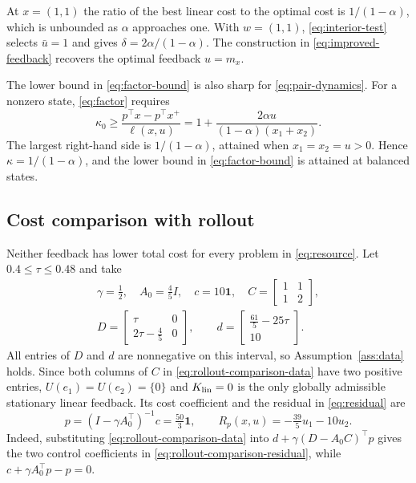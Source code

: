 \documentclass[10pt]{article}
\newcommand{\one}{\mathbf 1}
\begin{document}
At $x=(1,1)$ the ratio of the best linear cost to the optimal cost is $1/(1-\alpha)$, which is unbounded as $\alpha$ approaches one. With $w=(1,1)$, \eqref{eq:interior-test} selects $\bar u=1$ and gives $\delta=2\alpha/(1-\alpha)$. The construction in \eqref{eq:improved-feedback} recovers the optimal feedback $u=m_x$.

The lower bound in \eqref{eq:factor-bound} is also sharp for \eqref{eq:pair-dynamics}. For a nonzero state, \eqref{eq:factor} requires
\[
 \kappa_0\ge\frac{p^\top x-p^\top x^+}{\ell(x,u)}
 =1+\frac{2\alpha u}{(1-\alpha)(x_1+x_2)}.
\]
The largest right-hand side is $1/(1-\alpha)$, attained when $x_1=x_2=u>0$. Hence $\kappa=1/(1-\alpha)$, and the lower bound in \eqref{eq:factor-bound} is attained at balanced states.

\subsection{Cost comparison with rollout}

Neither feedback has lower total cost for every problem in \eqref{eq:resource}. Let $0.4\le\tau\le0.48$ and take
\begin{equation}
 \begin{gathered}
 \gamma=\tfrac12,\quad A_0=\tfrac45 I,\quad c=10\one,\quad
 C=\begin{bmatrix}1&1\\1&2\end{bmatrix},\\
 D=\begin{bmatrix}\tau&0\\2\tau-\tfrac45&0\end{bmatrix},\qquad
 d=\begin{bmatrix}\tfrac{61}{5}-25\tau\\10\end{bmatrix}.
 \end{gathered}
 \label{eq:rollout-comparison-data}
\end{equation}
All entries of $D$ and $d$ are nonnegative on this interval, so Assumption~\ref{ass:data} holds. Since both columns of $C$ in \eqref{eq:rollout-comparison-data} have two positive entries, $U(e_1)=U(e_2)=\{0\}$ and $K_{\rm lin}=0$ is the only globally admissible stationary linear feedback. Its cost coefficient and the residual in \eqref{eq:residual} are
\begin{equation}
 p=(I-\gamma A_0^\top)^{-1}c=\tfrac{50}{3}\one,
 \qquad R_p(x,u)=-\tfrac{39}{5}u_1-10u_2.
 \label{eq:rollout-comparison-residual}
\end{equation}
Indeed, substituting \eqref{eq:rollout-comparison-data} into $d+\gamma(D-A_0C)^\top p$ gives the two control coefficients in \eqref{eq:rollout-comparison-residual}, while $c+\gamma A_0^\top p-p=0$.
\end{document}
